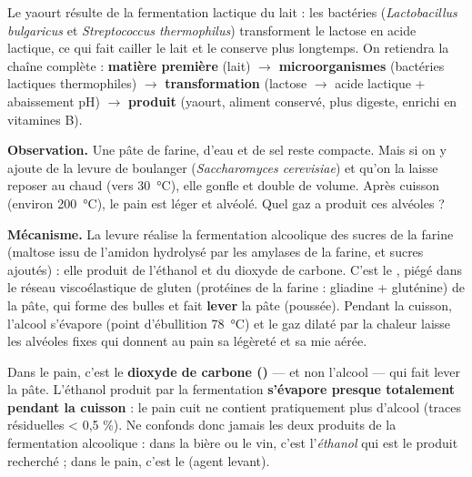 \documentclass[11pt]{article}
\newcommand{\cle}[1]{{\popxbold\color{popdark}#1}}
\newcounter{popsec}
\newcounter{popsub}
\newcommand{\courssub}[1]{%
  \stepcounter{popsub}%
  \par\vspace{9pt}\noindent{\popxbold\fontsize{11.5}{13}\selectfont\color{popink}{\color{poporange}\thepopsec.\thepopsub}\hspace{6pt}#1}\par\nopagebreak\vspace{4pt}
}
\begin{document}
\begin{exemplebox}
Le yaourt résulte de la fermentation lactique du lait : les bactéries (\emph{Lactobacillus bulgaricus} et \emph{Streptococcus thermophilus}) transforment le lactose en acide lactique, ce qui fait cailler le lait et le conserve plus longtemps. On retiendra la chaîne complète : \textbf{matière première} (lait) $\rightarrow$ \textbf{microorganismes} (bactéries lactiques thermophiles) $\rightarrow$ \textbf{transformation} (lactose $\rightarrow$ acide lactique + abaissement pH) $\rightarrow$ \textbf{produit} (yaourt, aliment conservé, plus digeste, enrichi en vitamines B).
\end{exemplebox}

\courssub{Le pain : la levure qui fait lever la pâte}

\textbf{Observation.} Une pâte de farine, d'eau et de sel reste compacte. Mais si on y ajoute de la \cle{levure de boulanger} (\emph{Saccharomyces cerevisiae}) et qu'on la laisse reposer au chaud (vers \SI{30}{\celsius}), elle gonfle et double de volume. Après cuisson (environ \SI{200}{\celsius}), le pain est léger et alvéolé. Quel gaz a produit ces alvéoles ?

\textbf{Mécanisme.} La levure réalise la \cle{fermentation alcoolique} des sucres de la farine (maltose issu de l'amidon hydrolysé par les amylases de la farine, et sucres ajoutés) : elle produit de l'éthanol et du dioxyde de carbone. C'est le , piégé dans le réseau viscoélastique de \cle{gluten} (protéines de la farine : gliadine + gluténine) de la pâte, qui forme des bulles et fait \textbf{lever} la pâte (poussée). Pendant la cuisson, l'alcool s'évapore (point d'ébullition \SI{78}{\celsius}) et le gaz dilaté par la chaleur laisse les alvéoles fixes qui donnent au pain sa légèreté et sa mie aérée.

\begin{attention}
Dans le pain, c'est le \textbf{dioxyde de carbone ()} — et non l'alcool — qui fait lever la pâte. L'éthanol produit par la fermentation \textbf{s'évapore presque totalement pendant la cuisson} : le pain cuit ne contient pratiquement plus d'alcool (traces résiduelles < 0,5 \%). Ne confonds donc jamais les deux produits de la fermentation alcoolique : dans la bière ou le vin, c'est l'\emph{éthanol} qui est le produit recherché ; dans le pain, c'est le \emph{} (agent levant).
\end{attention}
\end{document}
